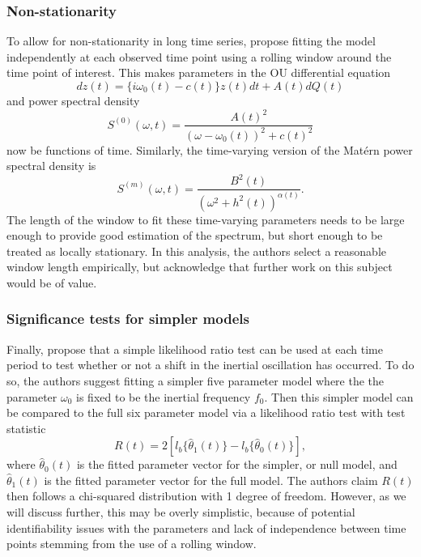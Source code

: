 \documentclass{stat572Style}
\begin{document}
\subsubsection{Non-stationarity}
To allow for non-stationarity in long time series, \citet{Sykulski2016} propose fitting the model independently at each observed time point using a rolling window around the time point of interest. 
This makes parameters in the OU differential equation
\begin{equation}
dz(t) = \{i \omega_{0}(t) - c(t) \} z(t) dt + A(t) dQ(t)
\end{equation}
and power spectral density
\begin{equation}
S^{(0)}(\omega, t) = \frac{A(t)^{2}}{(\omega - \omega_{0}(t))^{2} + c(t)^{2}}
\end{equation}
 now be functions of time. 
Similarly, the time-varying version of the Mat\'{e}rn power spectral density is 
\begin{equation}
S^{(m)}(\omega, t) = \frac{B^{2}(t)}{(\omega^{2} + h^{2}(t))^{\alpha(t)}}.
\end{equation}
The length of the window to fit these time-varying parameters needs to be large enough to provide good estimation of the spectrum, but short enough to be treated as locally stationary. 
 In this analysis, the authors select a reasonable window length empirically, but acknowledge that further work on this subject would be of value.  

\subsubsection{Significance tests for simpler models}
\label{sec: sig}
Finally, \citet{Sykulski2016} propose that a simple likelihood ratio test can be used at each time period to test whether or not a shift in the inertial oscillation has occurred. 
To do so, the authors suggest fitting a simpler five parameter model where the the parameter $\omega_{0}$ is fixed to be the inertial frequency $f_{0}$. 
Then this simpler model can be compared to the full six parameter model via a likelihood ratio test with test statistic
\begin{equation}
\label{eq: LRT}
R(t) = 2[l_{b} \{\hat{\theta}_{1}(t) \} - l_{b}\{\hat{\theta}_{0}(t) \} ],
\end{equation}
where $\hat{\theta}_{0}(t)$ is the fitted parameter vector for the simpler, or null model, and $\hat{\theta}_{1}(t)$ is the fitted parameter vector for the full model.
 The authors claim $R(t)$ then follows a chi-squared distribution with 1 degree of freedom. 
 However, as we will discuss further, this may be overly simplistic, because of potential identifiability issues with the parameters and lack of independence between time points stemming from the use of a rolling window. 
 
\end{document}
